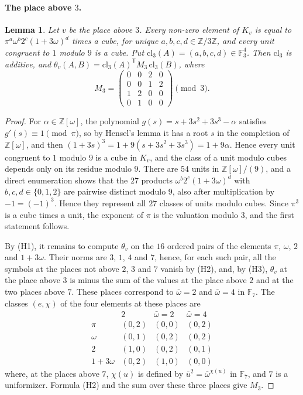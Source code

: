 \documentclass[11pt]{article}
\newtheorem{lemma}[theorem]{Lemma}
\newcommand{\Z}{\mathbb{Z}}
\newcommand{\F}{\mathbb{F}}
\begin{document}
\paragraph{The place above $3$.}
\begin{lemma}\label{lem:cM3}
Let $v$ be the place above $3$. Every non-zero element of $K_v$ is equal to $\pi^a\omega^b2^c(1+3\omega)^d$ times a cube, for unique $a,b,c,d\in\Z/3\Z$, and every unit congruent to $1$ modulo $9$ is a cube. Put $\mathrm{cl}_3(A)=(a,b,c,d)\in\F_3^4$. Then $\mathrm{cl}_3$ is additive, and $\theta_v(A,B)=\mathrm{cl}_3(A)^{\mathsf T}M_3\,\mathrm{cl}_3(B)$, where
\[
M_3=\begin{pmatrix}0&0&2&0\\0&0&1&2\\1&2&0&0\\0&1&0&0\end{pmatrix}\pmod3.
\]
\end{lemma}

\begin{proof}
For $\alpha\in\Z[\omega]$, the polynomial $g(s)=s+3s^2+3s^3-\alpha$ satisfies $g'(s)\equiv1\pmod\pi$, so by Hensel's lemma it has a root $s$ in the completion of $\Z[\omega]$, and then $(1+3s)^3=1+9(s+3s^2+3s^3)=1+9\alpha$. Hence every unit congruent to $1$ modulo $9$ is a cube in $K_v$, and the class of a unit modulo cubes depends only on its residue modulo $9$. There are $54$ units in $\Z[\omega]/(9)$, and a direct enumeration shows that the $27$ products $\omega^b2^c(1+3\omega)^d$ with $b,c,d\in\{0,1,2\}$ are pairwise distinct modulo $9$, also after multiplication by $-1=(-1)^3$. Hence they represent all $27$ classes of units modulo cubes. Since $\pi^3$ is a cube times a unit, the exponent of $\pi$ is the valuation modulo $3$, and the first statement follows.

By (H1), it remains to compute $\theta_v$ on the $16$ ordered pairs of the elements $\pi$, $\omega$, $2$ and $1+3\omega$. Their norms are $3$, $1$, $4$ and $7$, hence, for each such pair, all the symbols at the places not above $2$, $3$ and $7$ vanish by (H2), and, by (H3), $\theta_v$ at the place above $3$ is minus the sum of the values at the place above $2$ and at the two places above $7$. These places correspond to $\bar\omega=2$ and $\bar\omega=4$ in $\F_7$. The classes $(e,\chi)$ of the four elements at these places are
\[
\begin{array}{c|ccc}
 & 2 & \bar\omega=2 & \bar\omega=4\\\hline
\pi & (0,2) & (0,0) & (0,2)\\
\omega & (0,1) & (0,2) & (0,2)\\
2 & (1,0) & (0,2) & (0,1)\\
1+3\omega & (0,2) & (1,0) & (0,0)
\end{array}
\]
where, at the places above $7$, $\chi(u)$ is defined by $\bar u^2=\bar\omega^{\chi(u)}$ in $\F_7$, and $7$ is a uniformizer. Formula (H2) and the sum over these three places give $M_3$.
\end{proof}
\end{document}

